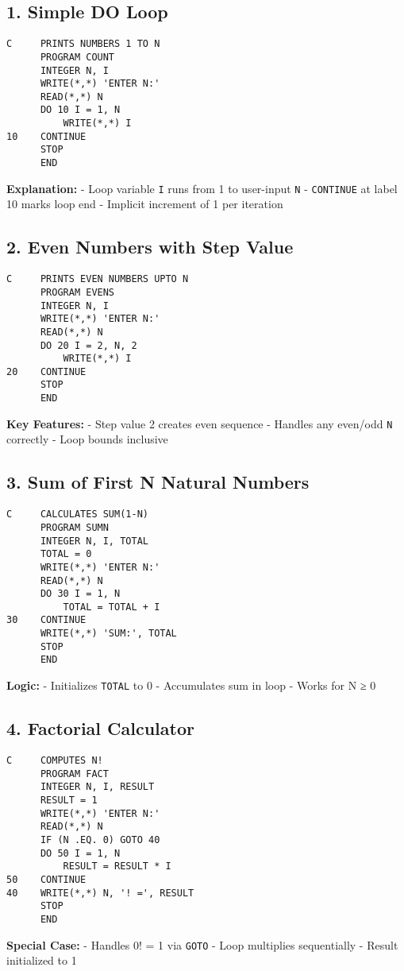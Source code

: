 \documentclass{book}
\begin{document}
\subsection*{1. Simple DO Loop}
\begin{verbatim}
C     PRINTS NUMBERS 1 TO N
      PROGRAM COUNT
      INTEGER N, I
      WRITE(*,*) 'ENTER N:'
      READ(*,*) N
      DO 10 I = 1, N
          WRITE(*,*) I
10    CONTINUE
      STOP
      END
\end{verbatim}
\textbf{Explanation:}
- Loop variable \texttt{I} runs from 1 to user-input \texttt{N}
- \texttt{CONTINUE} at label 10 marks loop end
- Implicit increment of 1 per iteration

\subsection*{2. Even Numbers with Step Value}
\begin{verbatim}
C     PRINTS EVEN NUMBERS UPTO N
      PROGRAM EVENS
      INTEGER N, I
      WRITE(*,*) 'ENTER N:'
      READ(*,*) N
      DO 20 I = 2, N, 2
          WRITE(*,*) I
20    CONTINUE
      STOP
      END
\end{verbatim}
\textbf{Key Features:}
- Step value 2 creates even sequence
- Handles any even/odd \texttt{N} correctly
- Loop bounds inclusive

\subsection*{3. Sum of First N Natural Numbers}
\begin{verbatim}
C     CALCULATES SUM(1-N)
      PROGRAM SUMN
      INTEGER N, I, TOTAL
      TOTAL = 0
      WRITE(*,*) 'ENTER N:'
      READ(*,*) N
      DO 30 I = 1, N
          TOTAL = TOTAL + I
30    CONTINUE
      WRITE(*,*) 'SUM:', TOTAL
      STOP
      END
\end{verbatim}
\textbf{Logic:}
- Initializes \texttt{TOTAL} to 0
- Accumulates sum in loop
- Works for N ≥ 0

\subsection*{4. Factorial Calculator}
\begin{verbatim}
C     COMPUTES N!
      PROGRAM FACT
      INTEGER N, I, RESULT
      RESULT = 1
      WRITE(*,*) 'ENTER N:'
      READ(*,*) N
      IF (N .EQ. 0) GOTO 40
      DO 50 I = 1, N
          RESULT = RESULT * I
50    CONTINUE
40    WRITE(*,*) N, '! =', RESULT
      STOP
      END
\end{verbatim}
\textbf{Special Case:}
- Handles 0! = 1 via \texttt{GOTO}
- Loop multiplies sequentially
- Result initialized to 1
\end{document}
